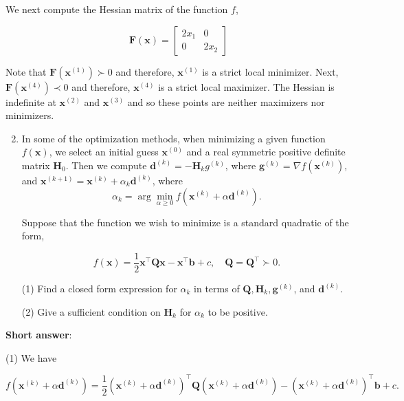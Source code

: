 We next compute the Hessian matrix of the function \(f\),

\[
	\boldsymbol{F}(\boldsymbol{x})=\left[\begin{array}{cc}
		2 x_{1} & 0 \\
		0 & 2 x_{2}
	\end{array}\right]
\]

Note that \(\boldsymbol{F}\left(\boldsymbol{x}^{(1)}\right) \succ 0\) and therefore, \(\boldsymbol{x}^{(1)}\) is a strict local minimizer. Next, \(\boldsymbol{F}\left(\boldsymbol{x}^{(4)}\right) \prec 0\) and therefore, \(\boldsymbol{x}^{(4)}\) is a strict local maximizer. The Hessian is indefinite at \(\boldsymbol{x}^{(2)}\) and \(\boldsymbol{x}^{(3)}\) and so these points are neither maximizers nor minimizers.

\begin{enumerate}
	\setcounter{enumi}{1}
	\item In some of the optimization methods, when minimizing a given function \(f(\boldsymbol{x})\), we select an initial guess \(\boldsymbol{x}^{(0)}\) and a real symmetric positive definite matrix \(\boldsymbol{H}_{0}\). Then we compute \(\boldsymbol{d}^{(k)}=-\boldsymbol{H}_{k} g^{(k)}\), where \(\boldsymbol{g}^{(k)}=\nabla f\left(\boldsymbol{x}^{(k)}\right)\), and \(\boldsymbol{x}^{(k+1)}=\boldsymbol{x}^{(k)}+\alpha_{k} \boldsymbol{d}^{(k)}\), where
	\[
		\alpha_{k}=\arg \min _{\alpha \geq 0} f\left(\boldsymbol{x}^{(k)}+\alpha \boldsymbol{d}^{(k)}\right) .
	\]

	Suppose that the function we wish to minimize is a standard quadratic of the form,
	
	\[
		f(\boldsymbol{x})=\frac{1}{2} \boldsymbol{x}^{\top} \boldsymbol{Q} \boldsymbol{x} - \boldsymbol{x}^{\top} \boldsymbol{b}+c, \quad \boldsymbol{Q}=\boldsymbol{Q}^{\top} \succ 0 .
	\]
	
	(1) Find a closed form expression for \(\alpha_{k}\) in terms of \(\boldsymbol{Q}, \boldsymbol{H}_{k}, \boldsymbol{g}^{(k)}\), and \(\boldsymbol{d}^{(k)}\).
	
	(2) Give a sufficient condition on \(\boldsymbol{H}_{k}\) for \(\alpha_{k}\) to be positive.

\end{enumerate}


\textbf{Short answer}:

(1) We have

\[
	f\left(\boldsymbol{x}^{(k)}+\alpha \boldsymbol{d}^{(k)}\right) = 
	\frac{1}{2}\left(\boldsymbol{x}^{(k)}+\alpha \boldsymbol{d}^{(k)}\right)^{\top} \boldsymbol{Q} \left(\boldsymbol{x}^{(k)}+\alpha \boldsymbol{d}^{(k)}\right)-\left(\boldsymbol{x}^{(k)}+\alpha \boldsymbol{d}^{(k)}\right)^{\top} \boldsymbol{b}+c .
\]

